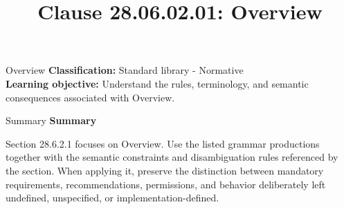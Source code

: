\documentclass[10pt,letterpaper]{article}
\title{Clause 28.06.02.01: Overview}
\author{}
\date{}
\begin{document}
\maketitle
\begin{CornellOverviewBox}{Overview}
\textbf{Classification:} Standard library - Normative\\[2pt]
\textbf{Learning objective:} Understand the rules, terminology, and semantic consequences associated with Overview.
\end{CornellOverviewBox}\begin{CornellSummaryBox}{Summary}
{\sffamily\bfseries\color{Accent} Summary}\par\vspace{3pt}Section 28.6.2.1 focuses on Overview. Use the listed grammar productions together with the semantic constraints and disambiguation rules referenced by the section. When applying it, preserve the distinction between mandatory requirements, recommendations, permissions, and behavior deliberately left undefined, unspecified, or implementation-defined.
\end{CornellSummaryBox}
\end{document}
